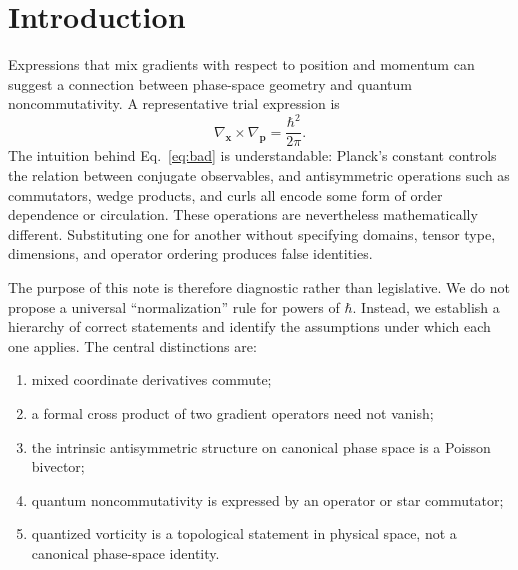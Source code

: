 \section{Introduction}

Expressions that mix gradients with respect to position and momentum can suggest a connection between phase-space geometry and quantum noncommutativity. A representative trial expression is
\begin{equation}
\nabla_{\bm{x}}\times\nabla_{\bm{p}}
=
\frac{\hbar^2}{2\pi}.
\label{eq:bad}
\end{equation}
The intuition behind Eq.~\eqref{eq:bad} is understandable: Planck's constant controls the relation between conjugate observables, and antisymmetric operations such as commutators, wedge products, and curls all encode some form of order dependence or circulation. These operations are nevertheless mathematically different. Substituting one for another without specifying domains, tensor type, dimensions, and operator ordering produces false identities.

The purpose of this note is therefore diagnostic rather than legislative. We do not propose a universal ``normalization'' rule for powers of \(\hbar\). Instead, we establish a hierarchy of correct statements and identify the assumptions under which each one applies. The central distinctions are:
\begin{enumerate}[label=(\roman*)]
  \item mixed coordinate derivatives commute;
  \item a formal cross product of two gradient operators need not vanish;
  \item the intrinsic antisymmetric structure on canonical phase space is a Poisson bivector;
  \item quantum noncommutativity is expressed by an operator or star commutator;
  \item quantized vorticity is a topological statement in physical space, not a canonical phase-space identity.
\end{enumerate}
